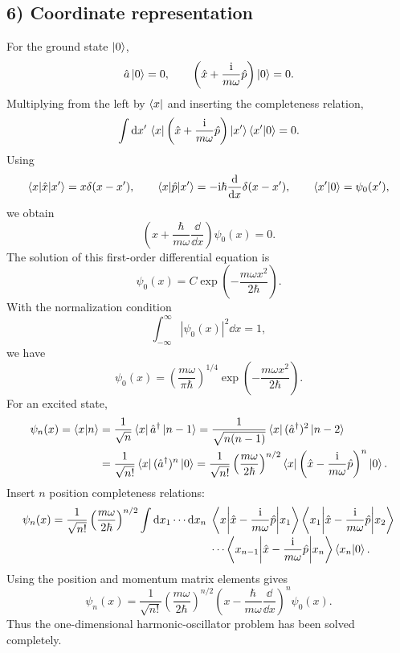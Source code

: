 \subsection*{6) Coordinate representation}
For the ground state $\left|0\right\rangle$,
\begin{equation}
\hat{a}\left|0\right\rangle=0,\qquad
\left(\hat{x}+\frac{\mathrm{i}}{m\omega}\hat{p}\right)\left|0\right\rangle=0.
\end{equation}
Multiplying from the left by $\left\langle x\right|$ and inserting the completeness relation,
\begin{equation}
\int\mathrm{d} x'\,\left\langle x\right|\left(\hat{x}+\frac{\mathrm{i}}{m\omega}\hat{p}\right)\left|x'\right\rangle\left\langle x'\middle|0\right\rangle=0.
\end{equation}
Using
\begin{equation}
\left\langle x\middle|\hat{x}\middle|x'\right\rangle=x\delta(x-x'),\qquad
\left\langle x\middle|\hat{p}\middle|x'\right\rangle=-\mathrm{i}\hbar\frac{\mathrm{d}}{\mathrm{d} x}\delta(x-x'),\qquad
\left\langle x'\middle|0\right\rangle=\psi_0(x'),
\end{equation}
we obtain
\begin{equation}
\left(x+\frac\hbar{m\omega}\frac{\dd}{\dd x}\right)\psi_0(x)=0.
\end{equation}
The solution of this first-order differential equation is
\begin{equation}
\psi_0(x)=C\exp\left(-\frac{m\omega x^2}{2\hbar}\right).
\end{equation}
With the normalization condition
\begin{equation}
\int_{-\infty}^{\infty}|\psi_0(x)|^2\dd x=1,
\end{equation}
we have
\begin{equation}
\boxed{\psi_0(x)=\left(\frac{m\omega}{\pi\hbar}\right)^{1/4}
\exp\left(-\frac{m\omega x^2}{2\hbar}\right).}
\end{equation}
For an excited state,
\begin{equation}
\begin{split}
\psi_n(x)=\left\langle x\middle|n\right\rangle
&=\frac1{\sqrt n}\left\langle x\right|\hat{a}^{\dagger}\left|n-1\right\rangle
=\frac1{\sqrt{n(n-1)}}\left\langle x\right|(\hat{a}^{\dagger})^2\left|n-2\right\rangle\\
&=\frac1{\sqrt{n!}}\left\langle x\right|(\hat{a}^{\dagger})^n\left|0\right\rangle
=\frac1{\sqrt{n!}}\left(\frac{m\omega}{2\hbar}\right)^{n/2}
\left\langle x\right|\left(\hat{x}-\frac{\mathrm{i}}{m\omega}\hat{p}\right)^n\left|0\right\rangle.
\end{split}
\end{equation}
Insert $n$ position completeness relations:
\begin{equation}
\begin{split}
\psi_n(x)=\frac1{\sqrt{n!}}\left(\frac{m\omega}{2\hbar}\right)^{n/2}
\int\mathrm{d} x_1\cdots\mathrm{d} x_n\;&\left\langle x\middle|\hat{x}-\frac{\mathrm{i}}{m\omega}\hat{p}\middle|x_1\right\rangle
\left\langle x_1\middle|\hat{x}-\frac{\mathrm{i}}{m\omega}\hat{p}\middle|x_2\right\rangle\\[-2pt]
&\cdots\left\langle x_{n-1}\middle|\hat{x}-\frac{\mathrm{i}}{m\omega}\hat{p}\middle|x_n\right\rangle\left\langle x_n\middle|0\right\rangle.
\end{split}
\end{equation}
Using the position and momentum matrix elements gives
\begin{equation}
\boxed{\psi_n(x)=\frac1{\sqrt{n!}}\left(\frac{m\omega}{2\hbar}\right)^{n/2}
\left(x-\frac\hbar{m\omega}\frac{\dd}{\dd x}\right)^n\psi_0(x).}
\end{equation}
Thus the one-dimensional harmonic-oscillator problem has been solved completely.

